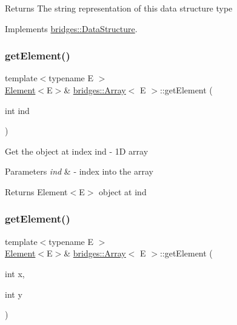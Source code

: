 \begin{DoxyReturn}{Returns}
The string representation of this data structure type 
\end{DoxyReturn}


Implements \mbox{\hyperlink{classbridges_1_1_data_structure_a957a63b106e340bc753620c650632bdc}{bridges\+::\+Data\+Structure}}.

\mbox{\label{classbridges_1_1_array_ac5ff703692153e1831cbea6edd3007e7}} 
\subsubsection{\texorpdfstring{get\+Element()}{getElement()}\hspace{0.1cm}{\footnotesize\ttfamily [1/3]}}
{\footnotesize\ttfamily template$<$typename E $>$ \\
\mbox{\hyperlink{classbridges_1_1_element}{Element}}$<$E$>$\& \mbox{\hyperlink{classbridges_1_1_array}{bridges\+::\+Array}}$<$ E $>$\+::get\+Element (\begin{DoxyParamCaption}\item[{int}]{ind }\end{DoxyParamCaption})\hspace{0.3cm}{\ttfamily [inline]}}

Get the object at index ind -\/ 1D array


\begin{DoxyParams}{Parameters}
{\em ind} & -\/ index into the array\\
\hline
\end{DoxyParams}
\begin{DoxyReturn}{Returns}
Element$<$\+E$>$ object at \textquotesingle{}ind\textquotesingle{} 
\end{DoxyReturn}
\mbox{\label{classbridges_1_1_array_acd5e730e0369b1fa699a5907e889f213}} 
\subsubsection{\texorpdfstring{get\+Element()}{getElement()}\hspace{0.1cm}{\footnotesize\ttfamily [2/3]}}
{\footnotesize\ttfamily template$<$typename E $>$ \\
\mbox{\hyperlink{classbridges_1_1_element}{Element}}$<$E$>$\& \mbox{\hyperlink{classbridges_1_1_array}{bridges\+::\+Array}}$<$ E $>$\+::get\+Element (\begin{DoxyParamCaption}\item[{int}]{x,  }\item[{int}]{y }\end{DoxyParamCaption})\hspace{0.3cm}{\ttfamily [inline]}}

